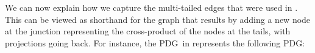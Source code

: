 \documentclass{article}
\newcommand{\MN}{PDG}
\numberwithin{equation}{section}
\begin{document}
\begin{notfocus}

	We can now explain how we capture the multi-tailed edges that were used in 
	.
%
This can be viewed as shorthand for the graph that results by
adding a new
node at the junction representing the cross-product of the 
nodes at the tails, with projections going back.  For
instance,  the \MN\ in 
represents the following PDG:

	\begin{center}
\end{center}
\end{notfocus}
\end{document}
